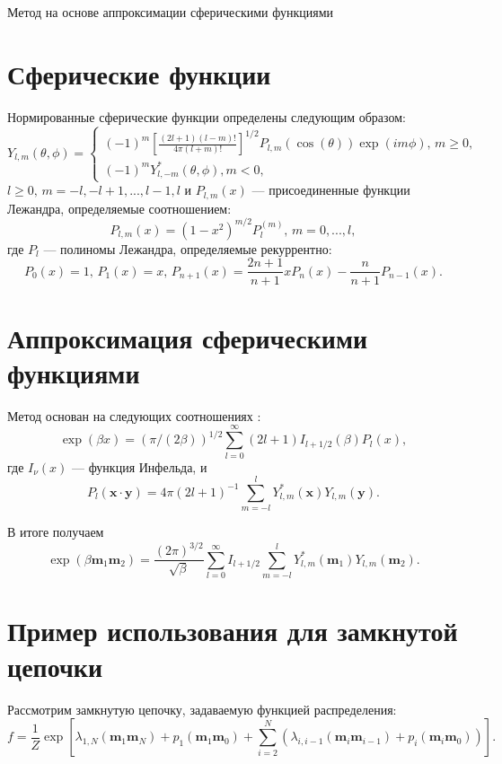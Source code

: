 \documentclass[12pt]{article}
\def\m{\mathbf m{}}
\begin{document}
\begin{center}
    Метод на основе аппроксимации сферическими функциями
\end{center}

\section{Сферические функции} 
Нормированные сферические функции определены следующим образом:
\begin{equation}\label{Ylm:eq}
  Y_{l,m}(\theta, \phi) =
  \begin{cases}
    (-1)^m \left[\frac{(2l+1)(l-m)!}{4\pi(l+m)!} \right]^{1/2} P_{l, m}(\cos(\theta))\exp(i m \phi),\, m \geq 0,
    \\
    (-1)^m Y^{*}_{l, -m}(\theta, \phi), m < 0,
  \end{cases}
\end{equation}
$l \geq 0,\, m = -l, -l+1, ..., l-1, l $ и $P_{l,m}(x)$ --- присоединенные функции Лежандра, определяемые соотношением:
\begin{equation}
  P_{l,m}(x) = (1-x^2)^{m/2}P_l^{(m)},\, m = 0, ..., l,
\end{equation}
где $P_l$ --- полиномы Лежандра, определяемые рекуррентно:
\begin{equation}
  P_0(x) = 1,\, P_1(x) = x,\, P_{n+1}(x) = \frac{2n+1}{n+1}xP_n(x)-\frac{n}{n+1}P_{n-1}(x).
\end{equation}
\section{Аппроксимация сферическими функциями}
Метод основан на следующих соотношениях \cite{joyce1967classical}:
\begin{equation}
  \exp(\beta x) = (\pi/(2\beta))^{1/2}\sum_{l=0}^{\infty}(2l+1)I_{l+1/2}(\beta)P_l(x),
\end{equation}
где $I_\nu(x)$ --- функция Инфельда, и
\begin{equation}
  P_l(\mathbf{x}\cdot\mathbf{y}) = 4\pi(2l+1)^{-1}\sum_{m=-l}^{l} Y^{*}_{l, m}(\mathbf{x})Y_{l, m}(\mathbf{y}).
\end{equation} 

В итоге получаем 
\begin{equation}
  \exp(\beta\m_1\m_2) = \frac{(2\pi)^{3/2}}{\sqrt{\beta}}\sum_{l=0}^{\infty}I_{l+1/2}\sum_{m=-l}^{l} Y^{*}_{l, m}(\m_1)Y_{l, m}(\m_2).
\end{equation}

\section{Пример использования для замкнутой цепочки}
Рассмотрим замкнутую цепочку, задаваемую функцией распределения:
\begin{equation}
  f = \frac{1}{Z} \exp\left[ \lambda_{1,N}(\m_1\m_N)+p_1(\m_1\m_0) + \sum_{i=2}^{N}\left( \lambda_{i,i-1}(\m_i\m_{i-1})+p_i(\m_i\m_0) \right) \right].
\end{equation}
\end{document}
